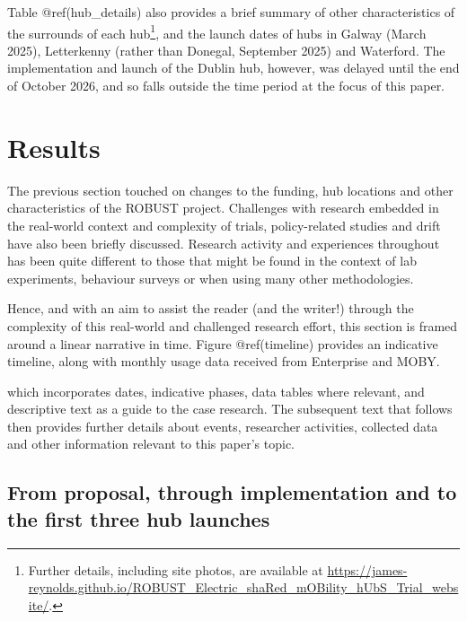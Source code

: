 \documentclass[preprint, 3p,
authoryear]{elsarticle} %
\begin{document}
Table @ref(hub\_details) also provides a brief summary of other
characteristics of the surrounds of each hub\footnote{Further details,
  including site photos, are available at
  \url{https://james-reynolds.github.io/ROBUST_Electric_shaRed_mOBility_hUbS_Trial_website/}.},
and the launch dates of hubs in Galway (March 2025), Letterkenny (rather
than Donegal, September 2025) and Waterford. The implementation and
launch of the Dublin hub, however, was delayed until the end of October
2026, and so falls outside the time period at the focus of this paper.

\section{Results}\label{results}

The previous section touched on changes to the funding, hub locations
and other characteristics of the ROBUST project. Challenges with
research embedded in the real-world context and complexity of trials,
policy-related studies and drift have also been briefly discussed.
Research activity and experiences throughout has been quite different to
those that might be found in the context of lab experiments, behaviour
surveys or when using many other methodologies.

Hence, and with an aim to assist the reader (and the writer!) through
the complexity of this real-world and challenged research effort, this
section is framed around a linear narrative in time. Figure
@ref(timeline) provides an indicative timeline, along with monthly usage
data received from Enterprise and MOBY.

which incorporates dates, indicative phases, data tables where relevant,
and descriptive text as a guide to the case research. The subsequent
text that follows then provides further details about events, researcher
activities, collected data and other information relevant to this
paper's topic.

\subsection{From proposal, through implementation and to the first three
hub
launches}\label{from-proposal-through-implementation-and-to-the-first-three-hub-launches}
\end{document}

